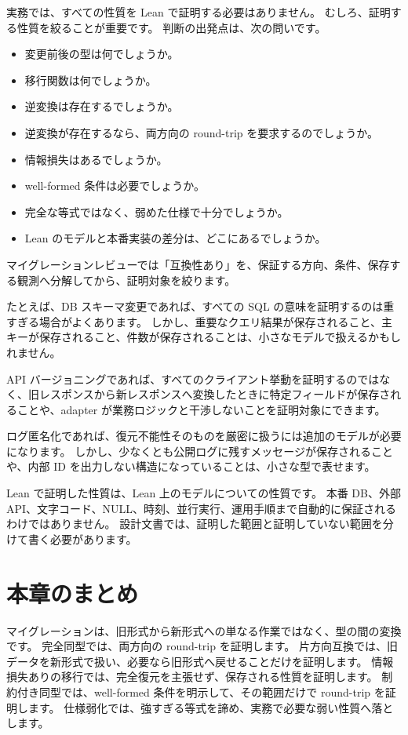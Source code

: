 実務では、すべての性質を Lean で証明する必要はありません。
むしろ、証明する性質を絞ることが重要です。
判断の出発点は、次の問いです。

\begin{itemize}
\item 変更前後の型は何でしょうか。
\item 移行関数は何でしょうか。
\item 逆変換は存在するでしょうか。
\item 逆変換が存在するなら、両方向の round-trip を要求するのでしょうか。
\item 情報損失はあるでしょうか。
\item well-formed 条件は必要でしょうか。
\item 完全な等式ではなく、弱めた仕様で十分でしょうか。
\item Lean のモデルと本番実装の差分は、どこにあるでしょうか。
\end{itemize}

マイグレーションレビューでは「互換性あり」を、保証する方向、条件、保存する観測へ分解してから、証明対象を絞ります。

たとえば、DB スキーマ変更であれば、すべての SQL の意味を証明するのは重すぎる場合がよくあります。
しかし、重要なクエリ結果が保存されること、主キーが保存されること、件数が保存されることは、小さなモデルで扱えるかもしれません。

API バージョニングであれば、すべてのクライアント挙動を証明するのではなく、旧レスポンスから新レスポンスへ変換したときに特定フィールドが保存されることや、adapter が業務ロジックと干渉しないことを証明対象にできます。

ログ匿名化であれば、復元不能性そのものを厳密に扱うには追加のモデルが必要になります。
しかし、少なくとも公開ログに残すメッセージが保存されることや、内部 ID を出力しない構造になっていることは、小さな型で表せます。

Lean で証明した性質は、Lean 上のモデルについての性質です。
本番 DB、外部 API、文字コード、NULL、時刻、並行実行、運用手順まで自動的に保証されるわけではありません。
設計文書では、証明した範囲と証明していない範囲を分けて書く必要があります。

\section{本章のまとめ}

マイグレーションは、旧形式から新形式への単なる作業ではなく、型の間の変換です。
完全同型では、両方向の round-trip を証明します。
片方向互換では、旧データを新形式で扱い、必要なら旧形式へ戻せることだけを証明します。
情報損失ありの移行では、完全復元を主張せず、保存される性質を証明します。
制約付き同型では、well-formed 条件を明示して、その範囲だけで round-trip を証明します。
仕様弱化では、強すぎる等式を諦め、実務で必要な弱い性質へ落とします。
